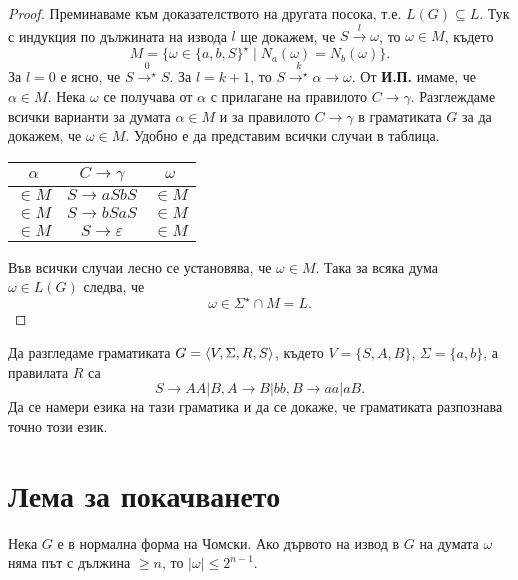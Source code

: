 \begin{proof}
  Преминаваме към доказателството на другата посока, т.е. $L(G) \subseteq L$.
  Тук с индукция по дължината на извода $l$ ще докажем, че
  $S \stackrel{l}{\rightarrow} \omega$, то $\omega \in M$,
  където
  \[M = \{\omega \in \{a,b,S\}^\star \mid N_a(\omega) = N_b(\omega)\}.\]
  За $l = 0$  е ясно, че $S \stackrel{0}{\rightarrow^\star} S$.
  За $l = k+1$, то $S \stackrel{k}{\rightarrow^\star} \alpha \rightarrow \omega$.
  От {\bf И.П.} имаме, че $\alpha \in M$.
  Нека $\omega$ се получава от $\alpha$ с прилагане на правилото $C \rightarrow \gamma$.
  Разглеждаме всички варианти за думата $\alpha \in M$ и за правилото $C\rightarrow \gamma$ в граматиката $G$
  за да докажем, че  $\omega \in M$.
  Удобно е да представим всички случаи в таблица.
  \begin{center}
    \begin{tabular}{| c | c | c |}
      \hline
      $\alpha$ & $C \rightarrow \gamma$ & $\omega$ \\ \hline
      $\in M$ & $S \rightarrow aSbS$ & $\in M$ \\ \hline
      $\in M$ & $S \rightarrow bSaS$ & $\in M$ \\ \hline
      $\in M$ & $S \rightarrow \varepsilon$ & $\in M$ \\ \hline
    \end{tabular}
  \end{center}
  Във всички случаи лесно се установява, че $\omega \in M$.
  Така за всяка дума $\omega \in L(G)$ следва, че
  \[\omega \in \Sigma^\star \cap M = L.\]
\end{proof}

\begin{problem}
  Да разгледаме граматиката $G = \langle{V,\Sigma,R,S}\rangle$, където  $V = \{S,A,B\}$, $\Sigma = \{a,b\}$, а правилата $R$ са
  \[S \to AA | B, A \to B | bb, B \to aa | aB.\]
  Да се намери езика на тази граматика и да се докаже, че граматиката разпознава точно този език.
\end{problem}

\section{Лема за покачването}

\begin{prop}
  Нека $G$ е в нормална форма на Чомски.
  Ако дървото на извод в $G$ на думата $\omega$ няма път с дължина $\geq n$,
  то $|\omega| \leq 2^{n-1}$.
\end{prop}


